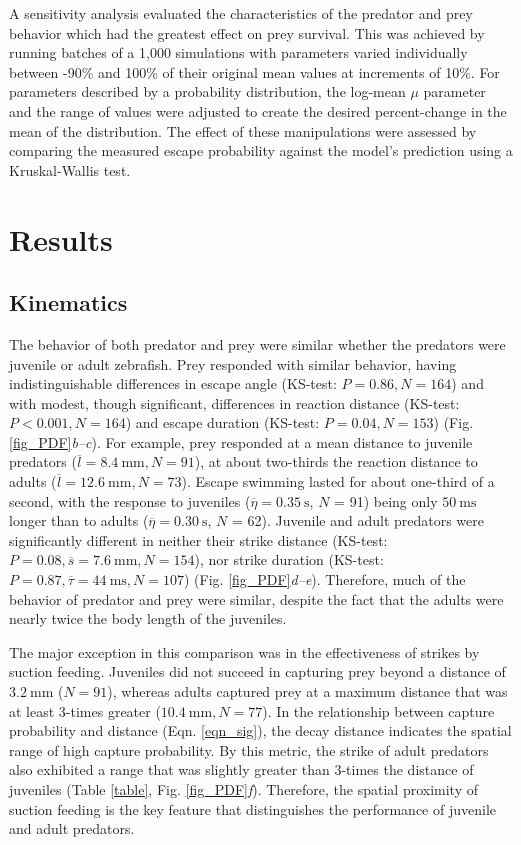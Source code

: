 \documentclass[]{rsos}%
\begin{document}
A sensitivity analysis evaluated the characteristics of the predator and prey behavior which had the greatest effect on prey survival. 
This was achieved by running batches of a 1,000 simulations with parameters varied individually between -90\% and 100\% of their original mean values at increments of 10\%.
For parameters described by a probability distribution, the log-mean $\mu$ parameter and the range of values were adjusted to create the desired percent-change in the mean of the distribution.
The effect of these manipulations were assessed by comparing the measured escape probability against the model's prediction using a Kruskal-Wallis test. 



\section{Results} %

\subsection{Kinematics} %
The behavior of both predator and prey were similar whether the predators were juvenile or adult zebrafish.
Prey responded with similar behavior, having indistinguishable differences in escape angle (KS-test: $P = 0.86, N = 164$) and with modest, though significant, differences in reaction distance (KS-test: $P < 0.001, N = 164$) and escape duration (KS-test: $P = 0.04, N = 153$) (Fig. \ref{fig_PDF}\textit{b--c}). 
For example, prey responded at a mean distance to juvenile predators ($\overline{l} = \SI{8.4}{\mm}, N = 91$), at about two-thirds the reaction distance to adults ($\overline{l} = \SI{12.6}{\mm}, N = 73$).
Escape swimming lasted for about one-third of a second, with the response to juveniles ($\overline{\eta} = \SI{0.35}{\s}$, $N$ = 91) being only  $\SI{50}{\ms}$ longer than to adults ($\overline{\eta} = \SI{0.30}{\s}$, $N$ = 62).
Juvenile and adult predators were significantly different in neither their strike distance (KS-test: $P = 0.08, \overline{s} = \SI{7.6}{\mm}, N = 154$), nor strike duration (KS-test: $P = 0.87, \overline{\tau} = \SI{44}{\ms}, N = 107$) (Fig. \ref{fig_PDF}\textit{d--e}).
Therefore, much of the behavior of predator and prey were similar, despite the fact that the adults were nearly twice the body length of the juveniles.

The major exception in this comparison was in the effectiveness of strikes by suction feeding.
Juveniles did not succeed in capturing prey beyond a distance of $\SI{3.2}{\mm}$ ($N = 91$), whereas adults captured prey at a maximum distance that was at least 3-times greater ($\SI{10.4}{\mm}, N = 77$).
In the relationship between capture probability and distance (Eqn. \ref{eqn_sig}), the decay distance indicates the spatial range of high capture probability. 
By this metric, the strike of adult predators also exhibited a range that was slightly greater than 3-times the distance of juveniles (Table \ref{table}, Fig. \ref{fig_PDF}\textit{f}).
Therefore, the spatial proximity of suction feeding is the key feature that distinguishes the performance of juvenile and adult predators.
\end{document}
